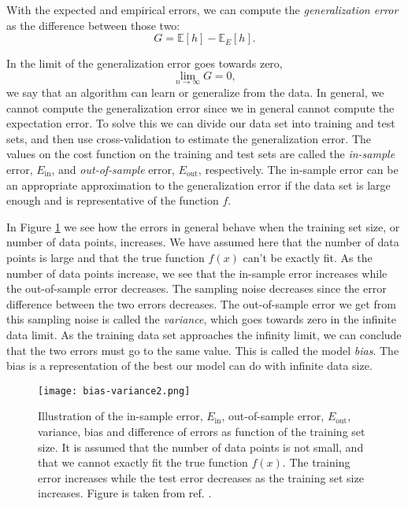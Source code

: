 \documentclass[a4paper, american, 12pt]{report}
\begin{document}
	With the expected and empirical errors, we can compute the \textit{generalization error} as the difference between those two:
	\begin{equation}
	\label{eq:Gen_error}
		G=\mathds{E}[h]-\mathds{E}_E[h].
	\end{equation}

	In the limit of the generalization error goes towards zero,
	\begin{equation*}
		\lim_{n\rightarrow\infty} G=0,
	\end{equation*}
	we say that an algorithm can learn or generalize from the data. In general, we cannot compute the generalization error since we in general cannot compute the expectation error. To solve this we can divide our data set into training and test sets, and then use cross-validation to estimate the generalization error. The values on the cost function on the training and test sets are called the \textit{in-sample} error, $E_{\text{in}}$, and \textit{out-of-sample} error, $E_{\text{out}}$, respectively. The in-sample error can be an appropriate approximation to the generalization error if the data set is large enough and is representative of the function $f$.
	
	In Figure \ref{fig:Bias-variance} we see how the errors in general behave when the training set size, or number of data points, increases. We have assumed here that the number of data points is large and that the true function $f(x)$ can't be exactly fit. As the number of data points increase, we see that the in-sample error increases while the out-of-sample error decreases. The sampling noise decreases since the error difference between the two errors decreases. The out-of-sample error we get from this sampling noise is called the \textit{variance}, which goes towards zero in the infinite data limit. As the training data set approaches the infinity limit, we can conclude that the two errors must go to the same value. This is called the model \textit{bias}. The bias is a representation of the best our model can do with infinite data size.
	\begin{figure}[ht!]
		\hspace*{-1.0cm}
		\centering\texttt{[image: bias-variance2.png]}
		\caption[In-sample and out-of-sample error as function of training set size.]{Illustration of the in-sample error, $E_{\text{in}}$, out-of-sample error, $E_{\text{out}}$, variance, bias and difference of errors as function of the training set size. It is assumed that the number of data points is not small, and that we cannot exactly fit the true function $f(x)$. The training error increases while the test error decreases as the training set size increases. Figure is taken from ref. \citet{mehta2019high}. \label{fig:Bias-variance}}
	\end{figure} 
	
\end{document}
